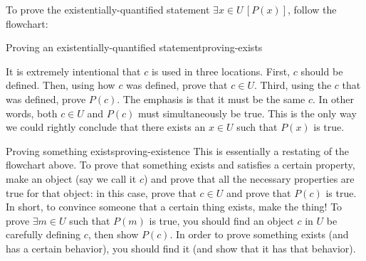 \documentclass{book}
\theoremstyle{ekimcustom}
\begin{document}
To prove the existentially-quantified statement $\exists x \in U\,[P(x)]$, follow the flowchart:
\begin{bmethod}{Proving an existentially-quantified statement}{proving-exists}
\begin{center}
\end{center}
\end{bmethod}

It is extremely intentional that $c$ is used in three locations. First, $c$ should be defined. Then, using how $c$ was defined, prove that $c \in U$. Third, using the $c$ that was defined, prove $P(c)$. The emphasis is that it must be the same $c$. In other words, both $c \in U$ and $P(c)$ must simultaneously be true. This is the only way we could rightly conclude that there exists an $x \in U$ such that $P(x)$ is true.

\begin{bremark}{Proving something exists}{proving-existence}
This is essentially a restating of the flowchart above. To prove that something exists and satisfies a certain property, make an object (say we call it $c$) and prove that all the necessary properties are true for that object: in this case, prove that $c \in U$ and prove that $P(c)$ is true. In short, to convince someone that a certain thing exists, make the thing! To prove $\exists m \in U$ such that $P(m)$ is true, you should find an object $c$ in $U$ be carefully defining $c$, then show $P(c)$.
\vskip6pt
In order to prove something exists (and has a certain behavior), you should find it (and show that it has that behavior).
\end{bremark}
\end{document}
